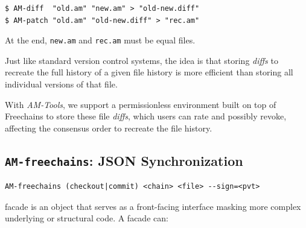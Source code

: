 \documentclass[12pt]{article}
\newcommand{\AMT}      {\emph{AM-Tools}\xspace}
\newcommand{\code}[1]  {\texttt{\footnotesize{#1}}}
\begin{document}
\begin{verbatim}
$ AM-diff  "old.am" "new.am" > "old-new.diff"
$ AM-patch "old.am" "old-new.diff" > "rec.am"
\end{verbatim}

At the end, \code{new.am} and \code{rec.am} must be equal files.

Just like standard version control systems, the idea is that storing
\emph{diffs} to recreate the full history of a given file history is more
efficient than storing all individual versions of that file.

With \AMT, we support a permissionless environment built on top of Freechains
to store these file \emph{diffs}, which users can rate and possibly revoke,
affecting the consensus order to recreate the file history.

\subsection{\code{AM-freechains}: JSON Synchronization}

\begin{verbatim}
AM-freechains (checkout|commit) <chain> <file> --sign=<pvt>
\end{verbatim}


facade is an object that serves as a front-facing interface masking more complex underlying or structural code. A facade can:



\end{document}
